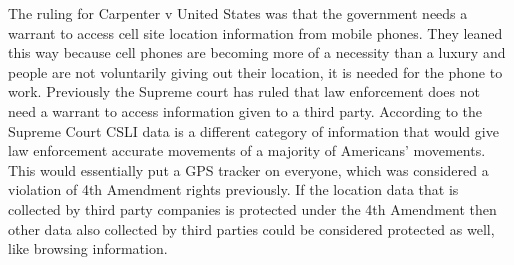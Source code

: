 \documentclass[12pt]{article}
\begin{document}
\begin{enumerate}
		The ruling for Carpenter v United States was that the government needs a warrant to access cell site location information from mobile phones. They leaned this way because cell phones are becoming more of a necessity than a luxury and people are not voluntarily giving out their location, it is needed for the phone to work. Previously the Supreme court has ruled that law enforcement does not need a warrant to access information given to a third party. According to the Supreme Court CSLI data is a different category of information that would give law enforcement accurate movements of a majority of Americans' movements. \cite{wired} This would  essentially put a GPS tracker on everyone, which was considered a violation of 4th Amendment rights previously. If the location data that is collected by third party companies is protected under the 4th Amendment then other data also collected by third parties could be considered protected as well, like browsing information. 

\end{enumerate}

{}

\end{document}
